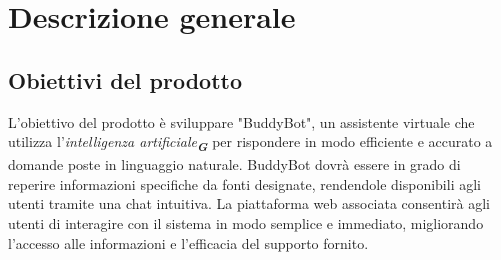 
\section{Descrizione generale}
\label{sec:descrizione_generale}

\subsection{Obiettivi del prodotto}
L'obiettivo del prodotto è sviluppare "BuddyBot", un assistente virtuale che utilizza l'\emph{intelligenza artificiale}\textsubscript{\textit{\textbf{G}}} 
per rispondere in modo efficiente e accurato a domande poste in linguaggio naturale. BuddyBot dovrà essere in grado 
di reperire informazioni specifiche da fonti designate, rendendole disponibili agli utenti tramite una chat intuitiva. 
La piattaforma web associata consentirà agli utenti di interagire con il sistema in modo semplice e immediato, migliorando
l'accesso alle informazioni e l'efficacia del supporto fornito.

